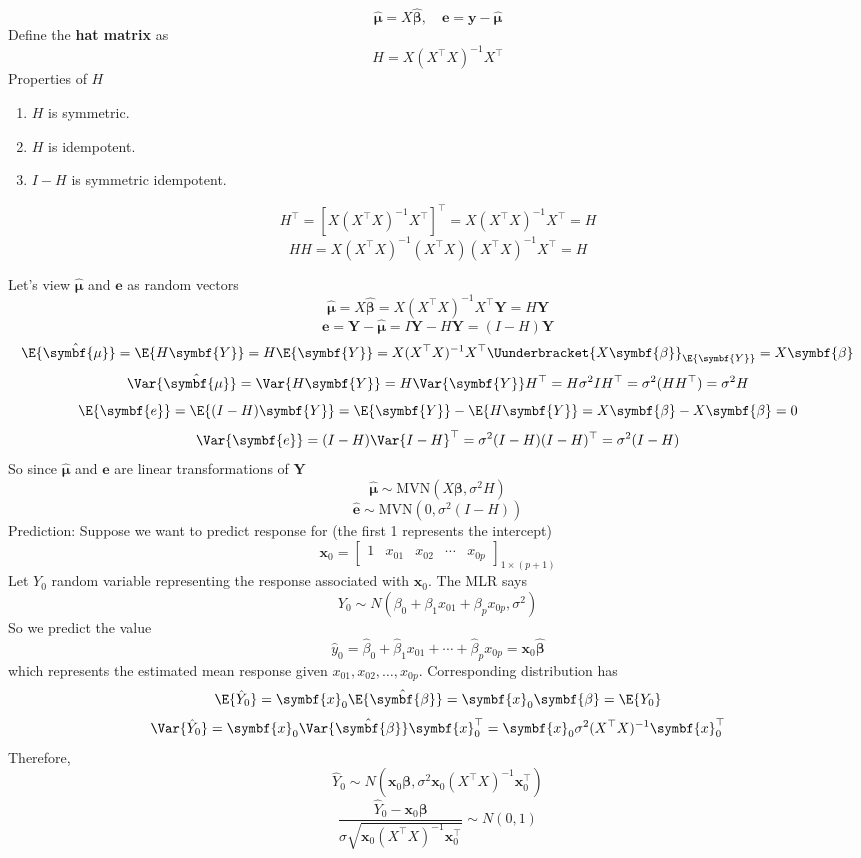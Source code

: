 \[ \hat{\symbf{\mu}}=X\hat{\symbf{\beta}},
    \quad \symbf{e}=\symbf{y}-\hat{\symbf{\mu}} \]
Define the \textbf{hat matrix} as
\[ H=X(X^\top X)^{-1}X^{\top} \]
Properties of $ H $
\begin{enumerate}[label=(\arabic*)]
    \item $ H $ is symmetric.
    \item $ H $ is idempotent.
    \item $ I-H $ is symmetric idempotent.
\end{enumerate}
\[ H^\top=[X(X^\top X)^{-1}X^\top]^\top=X(X^\top X)^{-1}X^\top=H \]
\[ HH=X(X^\top X)^{-1}(X^\top X)(X^\top X)^{-1}X^\top=H \]

Let's view $ \hat{\symbf{\mu}} $ and $ \symbf{e} $
as random vectors
\[ \hat{\symbf{\mu}}=X\hat{\symbf{\beta}}=
    X(X^\top X)^{-1}X^\top \symbf{Y}=H\symbf{Y} \]
\[ \symbf{e}=\symbf{Y}-\hat{\symbf{\mu}}=I\symbf{Y}-H\symbf{Y}=
    (I-H)\symbf{Y} \]
\[ \E{\hat{\symbf{\mu}}}=\E{H\symbf{Y}}=H\E{\symbf{Y}}=
    X(X^\top X)^{-1}X^\top \Uunderbracket{X\symbf{\beta}}_{\E{\symbf{Y}}}
    =X\symbf{\beta}
\]
\[ \Var{\hat{\symbf{\mu}}}=\Var{H\symbf{Y}}=
    H\Var{\symbf{Y}}H^\top=H\sigma^2I H^\top=\sigma^2(HH^\top)=\sigma^2H \]
\[ \E{ \symbf{e}}=
    \E{(I-H)\symbf{Y}}=\E{\symbf{Y}}-\E{H\symbf{Y}}=X\symbf{\beta}-X\symbf{\beta}=0 \]
\[ \Var{\symbf{e}}=
    (I-H)\Var{I-H}^\top=\sigma^2(I-H)(I-H)^\top=\sigma^2(I-H) \]
So since $ \hat{\symbf{\mu}} $ and $ \symbf{e} $
are linear transformations of $ \symbf{Y} $
\[ \hat{\symbf{\mu}}\sim\text{MVN}(X\symbf{\beta},\sigma^2 H) \]
\[ \hat{\symbf{e}}\sim\text{MVN}(0,\sigma^2(I-H)) \]
Prediction: Suppose we want to predict response for
(the first 1 represents the intercept)
\[ \symbf{x}_0=\begin{bmatrix}
        1 & x_{01} & x_{02} & \cdots & x_{0p}
    \end{bmatrix}_{1\times (p+1)} \]
Let $ Y_0 $ random variable representing the response
associated with $ \symbf{x}_0 $. The MLR says
\[ Y_0 \sim N(\beta_0+\beta_1x_{01}+\beta_p x_{0p},\sigma^2) \]
So we predict the value
\[ \hat{y}_0=\hat{\beta}_0+\hat{\beta}_1x_{01}+\cdots+
    \hat{\beta}_p x_{0p}=\symbf{x}_0\hat{\symbf{\beta}} \]
which represents the estimated mean response given
$ x_{01},x_{02},\ldots,x_{0p} $. Corresponding distribution
has
\[ \E{\hat{Y}_0}=\symbf{x}_0\E{\hat{\symbf{\beta}}}=\symbf{x}_0\symbf{\beta}
    =\E{Y_0} \]
\[ \Var{\hat{Y}_0}=\symbf{x}_0\Var{\hat{\symbf{\beta}}}\symbf{x}_0^\top=
    \symbf{x}_0\sigma^2(X^\top X)^{-1}\symbf{x}_0^\top \]
Therefore,
\[ \hat{Y}_0 \sim N(\symbf{x}_0\symbf{\beta},\sigma^2\symbf{x}_0(X^\top X)^{-1}
    \symbf{x}_0^\top) \]
\[ \frac{\hat{Y}_0-\symbf{x}_0\symbf{\beta}}{\sigma\sqrt{
            \symbf{x}_0(X^\top X)^{-1}\symbf{x}_0^\top
        }}\sim N(0,1)  \]

